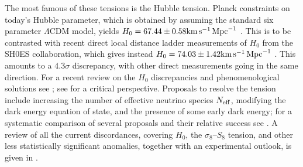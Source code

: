The most famous of these tensions is the Hubble tension.  Planck constraints on today's Hubble parameter, which is obtained by assuming the standard six parameter $\Lambda$CDM model, yields $H_0 = 67.44 \pm 0.58 {\rm km}\,{\rm s}^{-1}\,{\rm Mpc}^{-1}$ \cite{Planck:2018vyg}.  This is to be contrasted with recent direct local distance ladder measurements of $H_0$ from the SH0ES collaboration, which gives instead $H_0 = 74.03 \pm 1.42 {\rm km}\,{\rm s}^{-1}\,{\rm Mpc}^{-1}$ \cite{Riess:2019cxk}. This amounts to a $4.3\sigma$ discrepancy, with other direct measurements going in the same direction.  For a recent review on the $H_0$ discrepancies and phenomenological solutions see \cite{DiValentino:2021izs}; see \cite{Efstathiou:2020wxn} for a critical perspective. Proposals to resolve the tension include increasing the number of effective neutrino species $N_{\rm eff}$, modifying the dark energy equation of state, and the presence of some early dark energy; for a systematic comparison of several proposals and their relative success see \cite{Schoneberg:2021qvd}.  A review of all the current discordances, covering $H_0$, the $\sigma_8$--$S_8$ tension, and other less statistically significant anomalies, together with an experimental outlook, is given in \cite{Abdalla:2022yfr}.

\enddocument


\newpage
